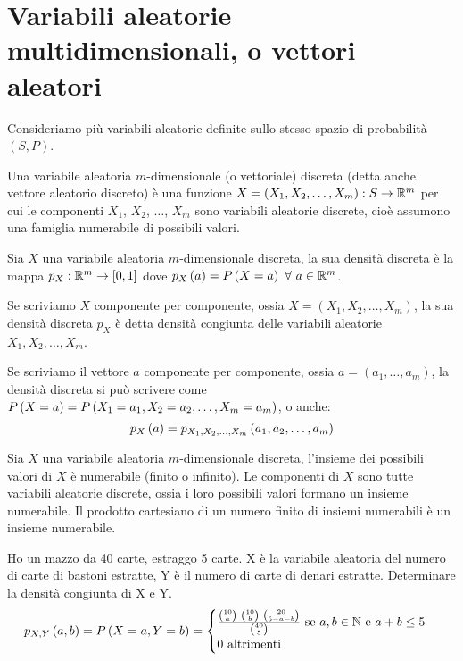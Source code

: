 \section{Variabili aleatorie multidimensionali, o vettori aleatori}

Consideriamo pi\`u variabili aleatorie definite sullo stesso spazio di probabilit\`a $(S,P)$.

\begin{defn}
Una variabile aleatoria $m$-dimensionale (o vettoriale) discreta (detta anche vettore aleatorio discreto) \`e una funzione $X = (X_1, X_2, \ldots, X_m) : S \to \reals^m$ per cui le componenti $X_1$, $X_2$, $\ldots$, $X_m$ sono variabili aleatorie discrete, cio\`e assumono una famiglia numerabile di possibili valori.
\end{defn}

\begin{defn}
Sia $X$ una variabile aleatoria $m$-dimensionale discreta, la sua densit\`a discreta \`e la mappa $p_X : \reals^m \to [0,1]$ dove $\mass{a} = \prob{X = a} \forall a \in \reals^m$.
\end{defn}
Se scriviamo $X$ componente per componente, ossia $X = (X_1, X_2, \ldots, X_m)$, la sua densit\`a discreta $p_X$ \`e detta densit\`a congiunta delle variabili aleatorie $X_1, X_2, \ldots, X_m$.

Se scriviamo il vettore $a$ componente per componente, ossia $a = (a_1, \dots, a_m)$, la densit\`a discreta si pu\`o scrivere come $\prob{X = a} = \prob{X_1 = a_1, X_2 = a_2, \ldots, X_m = a_m}$, o anche:
\[
\mass{a} = \mass[X_1, X_2, \ldots, X_m]{a_1, a_2, \ldots, a_m}
\]

\begin{oss}
Sia $X$ una variabile aleatoria $m$-dimensionale discreta, l'insieme dei possibili valori di $X$ \`e numerabile (finito o infinito). Le componenti di $X$ sono tutte variabili aleatorie discrete, ossia i loro possibili valori formano un insieme numerabile. Il prodotto cartesiano di un numero finito di insiemi numerabili \`e un insieme numerabile.
\end{oss}

\begin{exmp}
Ho un mazzo da 40 carte, estraggo 5 carte. X \`e la variabile aleatoria del numero di carte di bastoni estratte, Y \`e il numero di carte di denari estratte. Determinare la densit\`a congiunta di X e Y.
\[
\mass[X,Y]{a,b} = \prob{X = a, Y = b} =
\begin{cases}
\frac{\binom{10}{a} \ \binom{10}{b} \ \binom{20}{5 - a - b}}{\binom{40}{5}}
\text{ se } a,b \in \naturals \text{ e } a + b \le 5 \\
0 \text{ altrimenti}
\end{cases}
\]
\end{exmp}

